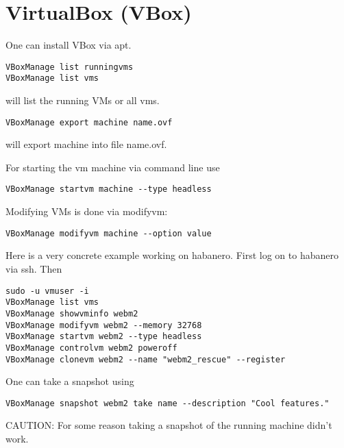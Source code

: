 \documentclass[a4paper]{book}
\begin{document}
\chapter{VirtualBox (VBox)}
One can install VBox via apt.

\begin{verbatim}
VBoxManage list runningvms
VBoxManage list vms
\end{verbatim}
will list the running VMs or all vms.

\begin{verbatim}
VBoxManage export machine name.ovf
\end{verbatim}
will export machine into file name.ovf.

For starting the vm machine via command line use
\begin{verbatim}
VBoxManage startvm machine --type headless
\end{verbatim}

Modifying VMs is done via modifyvm:
\begin{verbatim}
VBoxManage modifyvm machine --option value
\end{verbatim}

Here is a very concrete example working on habanero. First log on to habanero via ssh. Then
\begin{verbatim}
sudo -u vmuser -i
VBoxManage list vms
VBoxManage showvminfo webm2
VBoxManage modifyvm webm2 --memory 32768
VBoxManage startvm webm2 --type headless
VBoxManage controlvm webm2 poweroff
VBoxManage clonevm webm2 --name "webm2_rescue" --register
\end{verbatim}

One can take a snapshot using
\begin{verbatim}
VBoxManage snapshot webm2 take name --description "Cool features."
\end{verbatim}
CAUTION: For some reason taking a snapshot of the running machine didn't work.

\end{document}
